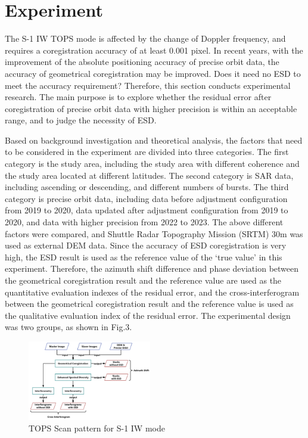 \documentclass[a4paper,fleqn]{cas-dc}
\begin{document}
\section{Experiment}
The S-1 IW TOPS mode is affected by the change of Doppler frequency, and requires a coregistration accuracy of at least 0.001 pixel. In recent years, with the improvement of the absolute positioning accuracy of precise orbit data, the accuracy of geometrical coregistration may be improved. Does it need no ESD to meet the accuracy requirement? Therefore, this section conducts experimental research. The main purpose is to explore whether the residual error after coregistration of precise orbit data with higher precision is within an acceptable range, and to judge the necessity of ESD. \par
Based on background investigation and theoretical analysis, the factors that need to be considered in the experiment are divided into three categories. The first category is the study area, including the study area with different coherence and the study area located at different latitudes. The second category is SAR data, including ascending or descending, and different numbers of bursts. The third category is precise orbit data, including data before adjustment configuration from 2019 to 2020, data updated after adjustment configuration from 2019 to 2020, and data with higher precision from 2022 to 2023. The above different factors were compared, and Shuttle Radar Topography Mission (SRTM) 30m was used as external DEM data. Since the accuracy of ESD coregistration is very high, the ESD result is used as the reference value of the ‘true value’ in this experiment. Therefore, the azimuth shift difference and phase deviation between the geometrical coregistration result and the reference value are used as the quantitative evaluation indexes of the residual error, and the cross-interferogram between the geometrical coregistration result and the reference value is used as the qualitative evaluation index of the residual error. The experimental design was two groups, as shown in Fig.3. \par
\begin{figure}
	\centering 
	\includegraphics[width=0.48\textwidth]{figure/Experimental flow chart.png}	
	\caption{TOPS Scan pattern for S-1 IW mode} 
	\label{fig_3}%
\end{figure}
\end{document}
